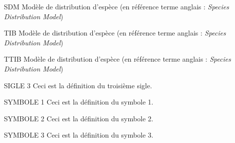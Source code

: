 \listeabrev
\begin{liste}

\item[SDM] Modèle de distribution d'espèce (en référence terme anglais : \textit{Species Distribution Model})

\item[TIB] Modèle de distribution d'espèce (en référence terme anglais : \textit{Species Distribution Model})

\item[TTIB] Modèle de distribution d'espèce (en référence terme anglais : \textit{Species Distribution Model})

\item[SIGLE 3] Ceci est la définition du troisième sigle.
\end{liste}


\listesymboles
\begin{liste}
\item[SYMBOLE 1] Ceci est la définition du symbole 1.

\item[SYMBOLE 2] Ceci est la définition du symbole 2.

\item[SYMBOLE 3] Ceci est la définition du symbole 3.
\end{liste}


\cleardoublepage
